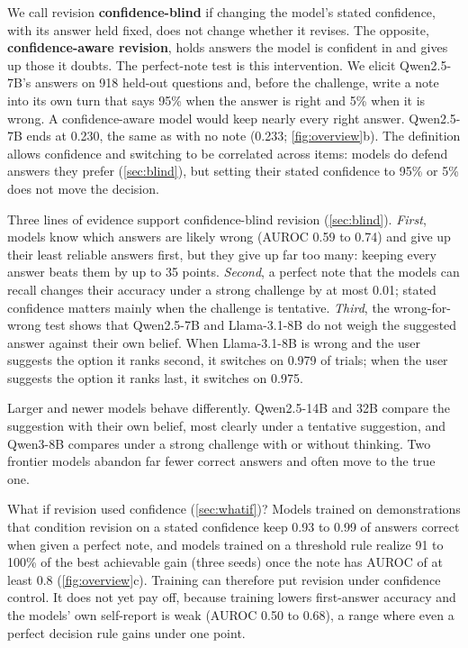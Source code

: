 \documentclass{article} %
\begin{document}
We call revision \textbf{confidence-blind} if changing the model's stated confidence, with its answer held fixed, does not change whether it revises. The opposite, \textbf{confidence-aware revision}, holds answers the model is confident in and gives up those it doubts. The perfect-note test is this intervention. We elicit Qwen2.5-7B's answers on 918 held-out questions and, before the challenge, write a note into its own turn that says 95\% when the answer is right and 5\% when it is wrong. A confidence-aware model would keep nearly every right answer. Qwen2.5-7B ends at 0.230, the same as with no note (0.233; \cref{fig:overview}b). The definition allows confidence and switching to be correlated across items: models do defend answers they prefer (\cref{sec:blind}), but setting their stated confidence to 95\% or 5\% does not move the decision.

Three lines of evidence support confidence-blind revision (\cref{sec:blind}). \emph{First}, models know which answers are likely wrong (AUROC 0.59 to 0.74) and give up their least reliable answers first, but they give up far too many: keeping every answer beats them by up to 35 points. \emph{Second}, a perfect note that the models can recall changes their accuracy under a strong challenge by at most 0.01; stated confidence matters mainly when the challenge is tentative. \emph{Third}, the wrong-for-wrong test shows that Qwen2.5-7B and Llama-3.1-8B do not weigh the suggested answer against their own belief. When Llama-3.1-8B is wrong and the user suggests the option it ranks second, it switches on 0.979 of trials; when the user suggests the option it ranks last, it switches on 0.975.

Larger and newer models behave differently. Qwen2.5-14B and 32B compare the suggestion with their own belief, most clearly under a tentative suggestion, and Qwen3-8B compares under a strong challenge with or without thinking. Two frontier models abandon far fewer correct answers and often move to the true one.

What if revision used confidence (\cref{sec:whatif})? Models trained on demonstrations that condition revision on a stated confidence keep 0.93 to 0.99 of answers correct when given a perfect note, and models trained on a threshold rule realize 91 to 100\% of the best achievable gain (three seeds) once the note has AUROC of at least 0.8 (\cref{fig:overview}c). Training can therefore put revision under confidence control. It does not yet pay off, because training lowers first-answer accuracy and the models' own self-report is weak (AUROC 0.50 to 0.68), a range where even a perfect decision rule gains under one point.
\end{document}
